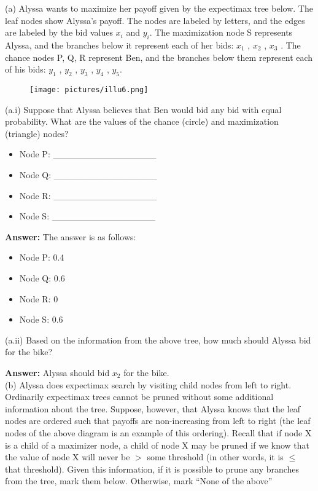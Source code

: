 \documentclass{article}
\begin{document}
\noindent (a) Alyssa wants to maximize her payoff given by the expectimax tree below. The leaf nodes show Alyssa’s payoff. The nodes are labeled by letters, and the edges are labeled by the bid values $x_i$ and $y_i$. The maximization node S represents Alyssa, and the branches below it represent each of her bids: $x_1$ , $x_2$ , $x_3$ . The chance nodes P, Q, R represent Ben, and the branches below them represent each of his bids: $y_1$ , $y_2$ , $y_3$ , $y_4$ , $y_5$.
\begin{figure}[h]
\centering
\texttt{[image: pictures/illu6.png]}
\end{figure}

\noindent (a.i) Suppose that Alyssa believes that Ben would bid any bid with equal probability. What are the values of the chance (circle) and maximization (triangle) nodes? 
\begin{itemize}
  \item Node P: \_\_\_\_\_\_\_\_\_\_\_\_\_\_\_\_
  \item Node Q: \_\_\_\_\_\_\_\_\_\_\_\_\_\_\_\_
  \item Node R: \_\_\_\_\_\_\_\_\_\_\_\_\_\_\_\_
  \item Node S: \_\_\_\_\_\_\_\_\_\_\_\_\_\_\_\_
\end{itemize}

\textbf{Answer:} The answer is as follows:

\begin{itemize}
    \item Node P: 0.4
    
    \item Node Q: 0.6
    
    \item Node R: 0
    
    \item Node S: 0.6
\end{itemize}

\noindent (a.ii) Based on the information from the above tree, how much should Alyssa bid for the bike?

\textbf{Answer:} Alyssa should bid $x_2$ for the bike. \\

\noindent (b) Alyssa does expectimax search by visiting child nodes from left to right. Ordinarily expectimax trees cannot be pruned without some additional information about the tree. Suppose, however, that Alyssa knows that the leaf nodes are ordered such that payoffs are non-increasing from left to right (the leaf nodes of the above diagram is an example of this ordering). Recall that if node X is a child of a maximizer node, a child of node X may be pruned if we know that the value of node X will never be $>$ some threshold (in other words, it is $\le$ that threshold). Given this information, if it is possible to prune any branches from the tree, mark them below. Otherwise, mark ``None of the above''
\end{document}
